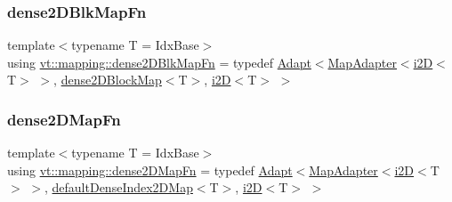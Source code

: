 \subsubsection{\texorpdfstring{dense2\+D\+Blk\+Map\+Fn}{dense2DBlkMapFn}}
{\footnotesize\ttfamily template$<$typename T  = Idx\+Base$>$ \\
using \hyperlink{namespacevt_1_1mapping_a528ef51db9f74e1bb6258a161b329873}{vt\+::mapping\+::dense2\+D\+Blk\+Map\+Fn} = typedef \hyperlink{namespacevt_1_1mapping_aafe187035ce8df02f31983e37cdb6a5d}{Adapt}$<$\hyperlink{namespacevt_1_1mapping_a41b113c28bb6430fbcb5be66e08ccf9f}{Map\+Adapter}$<$\hyperlink{namespacevt_1_1mapping_a6448c875e0807b43f31e96fc5b0cec04}{i2D}$<$T$>$ $>$, \hyperlink{namespacevt_1_1mapping_aca20bcd20c24f4a43e217ca63bf5812c}{dense2\+D\+Block\+Map}$<$T$>$, \hyperlink{namespacevt_1_1mapping_a6448c875e0807b43f31e96fc5b0cec04}{i2D}$<$T$>$ $>$}

\mbox{\label{namespacevt_1_1mapping_afea13b390fab1d1388658ed759f9f44f}} 
\subsubsection{\texorpdfstring{dense2\+D\+Map\+Fn}{dense2DMapFn}}
{\footnotesize\ttfamily template$<$typename T  = Idx\+Base$>$ \\
using \hyperlink{namespacevt_1_1mapping_afea13b390fab1d1388658ed759f9f44f}{vt\+::mapping\+::dense2\+D\+Map\+Fn} = typedef \hyperlink{namespacevt_1_1mapping_aafe187035ce8df02f31983e37cdb6a5d}{Adapt}$<$\hyperlink{namespacevt_1_1mapping_a41b113c28bb6430fbcb5be66e08ccf9f}{Map\+Adapter}$<$\hyperlink{namespacevt_1_1mapping_a6448c875e0807b43f31e96fc5b0cec04}{i2D}$<$T$>$ $>$, \hyperlink{namespacevt_1_1mapping_a011c4e2cb832d3edcd98e3803d405ad4}{default\+Dense\+Index2\+D\+Map}$<$T$>$, \hyperlink{namespacevt_1_1mapping_a6448c875e0807b43f31e96fc5b0cec04}{i2D}$<$T$>$ $>$}

\mbox{\label{namespacevt_1_1mapping_a7a86c7f1af7a323cd67e97e8897804e4}} 
